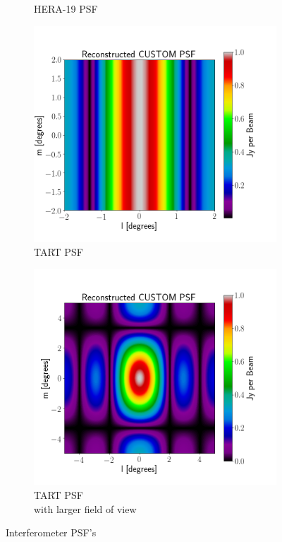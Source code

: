 \begin{figure}[H]
\begin{subfigure}[b]{0.49\textwidth}
    \caption{HERA-19 PSF}
    \label{fig:HERA-19 PSF}
  \end{subfigure}
  \newline
  \begin{subfigure}[b]{0.49\textwidth}
    \includegraphics[width=\textwidth]{images/TART_PSF.png}
    \caption{TART PSF}
    \label{fig:TART PSF}
  \end{subfigure}
  \begin{subfigure}[b]{0.49\textwidth}
    \includegraphics[width=\textwidth]{images/TART_PSF_CORRECT.png}
    \caption{TART PSF \\with larger field of view}
    \label{fig:TART PSF FOV}
    \vspace{-4mm}
  \end{subfigure}
  \caption{Interferometer PSF's}
\end{figure}

